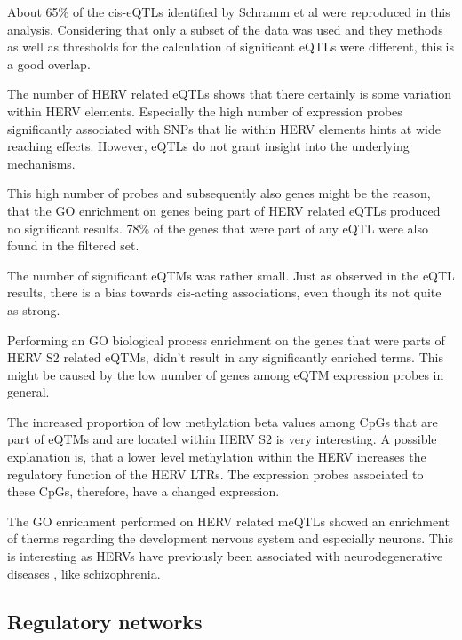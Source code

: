 \documentclass[a4paper,12pt,twoside,openright]{article}
\begin{document}
About 65\% of the cis-eQTLs identified by Schramm et al\cite{Schramm2014} were reproduced in this analysis. Considering that only a subset of the data was used and they methods as well as thresholds for the calculation of significant eQTLs were different, this is a good overlap. 

The number of HERV related eQTLs shows that there certainly is some variation within HERV elements. Especially the high number of expression probes significantly associated with SNPs that lie within HERV elements hints at wide reaching effects. However, eQTLs do not grant insight into the underlying mechanisms. 

This high number of probes and subsequently also genes might be the reason, that the GO enrichment on genes being part of HERV related eQTLs produced no significant results. 78\% of the genes that were part of any eQTL were also found in the filtered set.

The number of significant eQTMs was rather small. Just as observed in the eQTL results, there is a bias towards cis-acting associations, even though its not quite as strong. 

Performing an GO biological process enrichment on the genes that were parts of HERV S2 related eQTMs, didn't result in any significantly enriched terms. This might be caused by the low number of genes among eQTM expression probes in general.  

The increased proportion of low methylation beta values among CpGs that are part of eQTMs and are located within HERV S2 is very interesting. A possible explanation is, that a lower level methylation within the HERV increases the regulatory function of the HERV LTRs. The expression probes associated to these CpGs, therefore, have a changed expression. 

The GO enrichment performed on HERV related meQTLs showed an enrichment of therms regarding the development nervous system and especially neurons. This is interesting as HERVs have previously been associated with neurodegenerative diseases \cite{Mortelmans2016}, like schizophrenia\cite{10.3389/fpsyt.2015.00183}.

\subsection{Regulatory networks}
\label{Discussion:Regulatory networks}
\end{document}
